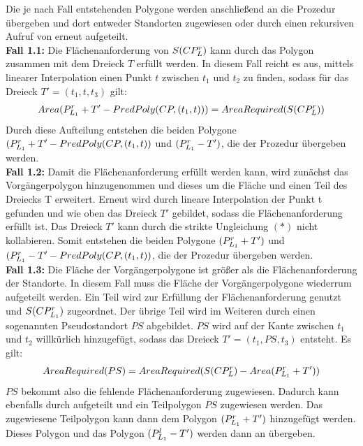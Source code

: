 \documentclass[ngerman]{seminarbeitrag}
\begin{document}
Die je nach Fall entstehenden Polygone werden anschließend an die Prozedur \daa übergeben und dort entweder Standorten zugewiesen oder durch einen rekursiven Aufruf von \noncon erneut aufgeteilt.\\

\textbf{Fall 1.1:} Die Flächenanforderung von $S(CP_{L}^{r})$ kann durch das Polygon \prleins zusammen mit dem Dreieck $T$ erfüllt werden. In diesem Fall reicht es aus, mittels linearer Interpolation einen Punkt $t$ zwischen $t_{1}$ und $t_{2}$ zu finden, sodass für das Dreieck $T' = (t_{1}, t, t_{3})$ gilt: \\
\begin{align*}Area(P_{L_{1}}^{r}+T'-PredPoly(CP,(t_{1},t)))=AreaRequired(S(CP_{L}^{r})) \end{align*}
Durch diese Aufteilung entstehen die beiden Polygone $(P_{L_{1}}^{r} + T' - PredPoly(CP,(t_{1},t))$ und \hbox{$(P_{L_{1}}^{r} -T')$}, die der Prozedur \daa übergeben werden.\\

\textbf{Fall 1.2:} Damit die Flächenanforderung erfüllt werden kann, wird zunächst das Vorgängerpolygon hinzugenommen und dieses um die Fläche \prleins und einen Teil des Dreiecks T erweitert. Erneut wird durch lineare Interpolation der Punkt t gefunden und wie oben das Dreieck $T'$ gebildet, sodass die Flächenanforderung erfüllt ist. Das Dreieck $T'$ kann durch die strikte Ungleichung $(\ast)$ nicht kollabieren. Somit entstehen die beiden Polygone $(P_{L_{1}}^{r} + T')$ und $(P_{L_{1}}^{r} - T' - PredPoly(CP,(t_{1},t))$, die der Prozedur \daa übergeben werden.\\

\textbf{Fall 1.3:} Die Fläche der Vorgängerpolygone ist größer als die Flächenanforderung der Standorte. In diesem Fall muss die Fläche der Vorgängerpolygone wiederrum aufgeteilt werden. Ein Teil wird zur Erfüllung der Flächenanforderung genutzt und $S(CP^{r}_{L_{1}})$ zugeordnet. Der übrige Teil wird im Weiteren durch einen sogenannten Pseudostandort $PS$ abgebildet. $PS$ wird auf der Kante zwischen $t_{1}$ und $t_{2}$ willkürlich hinzugefügt, sodass das Dreieck $T' = (t_{1}, PS, t_{3})$ entsteht. Es gilt:
\begin{align*}AreaRequired(PS)=AreaRequired(S(CP_{L}^{r}) - Area(P_{L_{1}}^{r} + T')) \end{align*}
$PS$ bekommt also die fehlende Flächenanforderung zugewiesen. Dadurch kann  ebenfalls durch \noncon aufgeteilt und ein Teilpolygon $PS$ zugewiesen werden. Das zugewiesene Teilpolygon kann dann dem Polygon $(P_{L_{1}}^{r} + T')$ hinzugefügt werden. Dieses Polygon und das Polygon $(P_{L_{1}}^{l} -T')$ werden dann an \daa übergeben. \\
\end{document}
